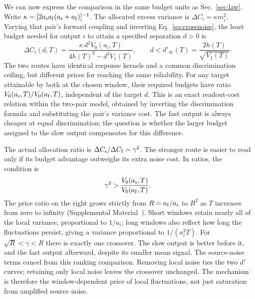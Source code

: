 \documentclass[aps,10pt,onecolumn,superscriptaddress,nofootinbib,longbibliography,
  amsmath,amssymb,floatfix]{revtex4-2}
\begin{document}
We can now express the comparison in the same budget units
as Sec.~\ref{sec:law}. Write
\(\kappa=[2a_{\rm s}a_{\rm f}(a_{\rm s}+a_{\rm f})]^{-1}\).
The allocated excess variance is \(\Delta C_i=\kappa m_i^2\).
Varying that pair's forward coupling and inverting
Eq.~\eqref{eq:crossnoise}, the least budget needed for output
\(i\) to attain a specified separation \(d>0\) is
\begin{equation}
 \Delta C_i(d,T)=
 \frac{\kappa\,d^2 V_0(a_i,T)}{4h(T)^2-d^2 V_1(T)},
 \qquad d<d'_\infty(T)=\frac{2h(T)}{\sqrt{V_1(T)}}.
 \label{eq:reliabilitycost}
\end{equation}
The two routes have identical response kernels and a common
discrimination ceiling, but different prices for reaching the
same reliability. For any target attainable by both at the
chosen window, their required budgets have ratio
\(V_0(a_{\rm s},T)/V_0(a_{\rm f},T)\), independent of the
target \(d\). This is an exact readout-cost relation within
the two-pair model, obtained by inverting the discrimination
formula and substituting the pair's variance cost. The fast
output is always cheaper at equal discrimination; the question
is whether the larger budget assigned to the slow output
compensates for this difference.

The actual allocation ratio is
\(\Delta C_{\rm s}/\Delta C_{\rm f}=\gamma^2\).
The stronger route is easier to read only if its budget advantage
outweighs its extra noise cost. In ratios, the condition is
\begin{equation}
 \gamma^2>\frac{V_0(a_{\rm s},T)}{V_0(a_{\rm f},T)}.
 \label{eq:crossover}
\end{equation}
The price ratio on the right grows strictly from \(R=a_{\rm f}/a_{\rm s}\)
to \(R^2\) as \(T\) increases from zero to infinity (Supplemental
Material~\cite{prrSupplement}). Short windows retain nearly all of
the local variance, proportional to \(1/a_i\); long windows also
reflect how long the fluctuations persist, giving a variance
proportional to \(1/(a_i^2T)\). For \(\sqrt R<\gamma<R\) there
is exactly one crossover. The slow output is better before it,
and the fast output afterward, despite its smaller mean signal.
The source-noise terms cancel from this ranking comparison.
Removing local noise ties the two \(d'\) curves; retaining only
local noise leaves the crossover unchanged. The mechanism is
therefore the window-dependent price of local fluctuations,
not just saturation from amplified source noise.
\end{document}
